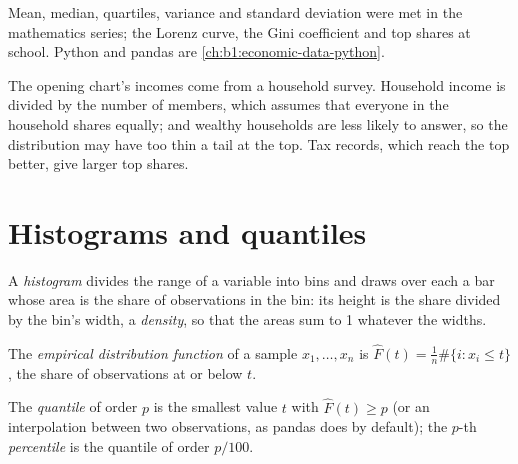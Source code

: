 \begin{recall}
Mean, median, quartiles, variance and standard deviation were met in the
mathematics series; the Lorenz curve, the Gini coefficient and top
shares at school. Python and pandas are \cref{ch:b1:economic-data-python}.
\end{recall}

\begin{measure}
The opening chart's incomes come from a household survey. Household income
is divided by the number of members, which assumes that everyone in the
household shares equally; and wealthy households are less likely to answer,
so the distribution may have too thin a tail at the top. %
Tax records, which reach the top better, give larger top shares.
\end{measure}

\section{Histograms and quantiles}\label{sec:b1:describing-data:histograms}

\begin{definition}[Histogram]\label{def:b1:describing-data:histogram}
A \emph{histogram} divides the range of a variable into bins and draws over
each a bar whose area is the share of observations in the bin: its height
is the share divided by the bin's width, a \emph{density}, so that the areas
sum to 1 whatever the widths.
\end{definition}

\begin{definition}\label{def:b1:describing-data:edf}
The \emph{empirical distribution function} of a sample $x_1, \dots, x_n$ is
$\hat F(t) = \frac1n\#\{i : x_i \le t\}$, the share of observations at or below $t$.
\end{definition}

\begin{definition}\label{def:b1:describing-data:quantile}
The \emph{quantile} of order $p$ is the smallest value $t$ with $\hat F(t) \ge p$ (or an
interpolation between two observations, as pandas does by default); the
$p$-th \emph{percentile} is the quantile of order $p/100$.
\end{definition}

\label{lst:b1:describing-data:histogram}


